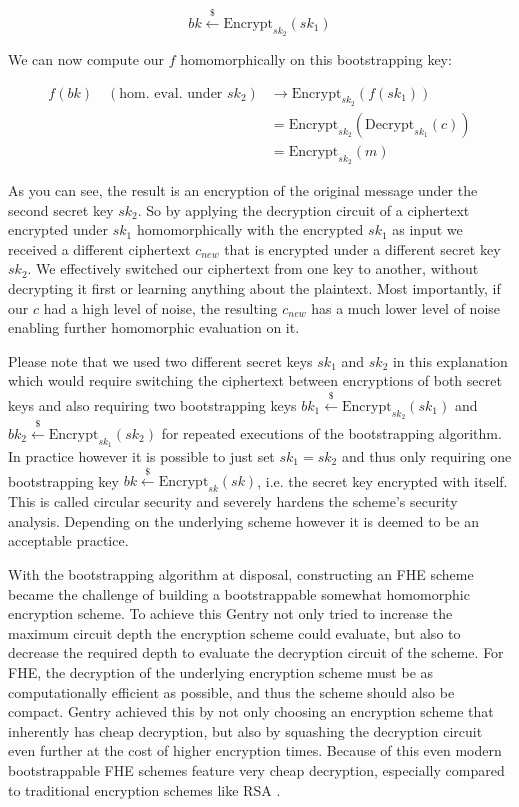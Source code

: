 \begin{equation}
    bk \xleftarrow{\$} \text{Encrypt}_{sk_2}(sk_1)
\end{equation}

We can now compute our $f$ homomorphically on this bootstrapping key:

\begin{equation}
    \begin{aligned}
        f(bk) \quad (\text{hom. eval. under } sk_2) &\rightarrow \text{Encrypt}_{sk_2}(f(sk_1))\\
                                       &=\text{Encrypt}_{sk_2}\left( \text{Decrypt}_{sk_1}(c) \right)\\
                                       &=\text{Encrypt}_{sk_2}(m)
    \end{aligned}
\end{equation}

As you can see, the result is an encryption of the original message under the second secret key $sk_2$. So by applying the decryption circuit of a ciphertext encrypted under $sk_1$ homomorphically with the encrypted $sk_1$ as input we received a different ciphertext $c_{new}$ that is encrypted under a different secret key $sk_2$. We effectively switched our ciphertext from one key to another, without decrypting it first or learning anything about the plaintext. Most importantly, if our $c$ had a high level of noise, the resulting $c_{new}$ has a much lower level of noise enabling further homomorphic evaluation on it. \cite{gentry_fully_2009} \cite{dolev_programmable_2021}

Please note that we used two different secret keys $sk_1$ and $sk_2$ in this explanation which would require switching the ciphertext between encryptions of both secret keys and also requiring two bootstrapping keys $bk_1 \xleftarrow{\$} \text{Encrypt}_{sk_2}(sk_1)$ and $bk_2 \xleftarrow{\$} \text{Encrypt}_{sk_1}(sk_2)$ for repeated executions of the bootstrapping algorithm. In practice however it is possible to just set $sk_1 = sk_2$ and thus only requiring one bootstrapping key $bk \xleftarrow{\$} \text{Encrypt}_{sk}(sk)$, i.e. the secret key encrypted with itself. This is called circular security and severely hardens the scheme's security analysis. Depending on the underlying scheme however it is deemed to be an acceptable practice.

With the bootstrapping algorithm at disposal, constructing an FHE scheme became the challenge of building a bootstrappable somewhat homomorphic encryption scheme. To achieve this Gentry not only tried to increase the maximum circuit depth the encryption scheme could evaluate, but also to decrease the required depth to evaluate the decryption circuit of the scheme. For FHE, the decryption of the underlying encryption scheme must be as computationally efficient as possible, and thus the scheme should also be compact. Gentry achieved this by not only choosing an encryption scheme that inherently has cheap decryption, but also by squashing the decryption circuit even further at the cost of higher encryption times. Because of this even modern bootstrappable FHE schemes feature very cheap decryption, especially compared to traditional encryption schemes like RSA \cite{gentry_fully_2009}.


